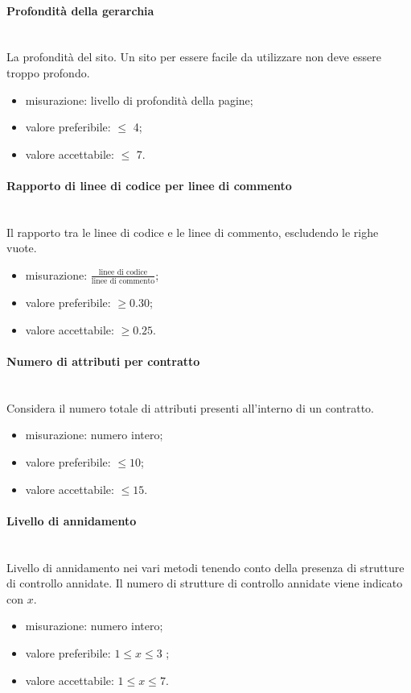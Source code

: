 			\paragraph*{Profondità della gerarchia} \mbox{}\\
			La profondità del sito. Un sito per essere facile da utilizzare non deve essere troppo profondo.
			\begin{itemize}
				\item misurazione: livello di profondità della pagine;
				\item valore preferibile: $\leq$ 4;
				\item valore accettabile: $\leq$ 7.
			\end{itemize}
		
			\paragraph*{Rapporto di linee di codice per linee di commento}
			 \mbox{}\\
			Il rapporto tra le linee di codice
			e le linee di commento, escludendo le righe vuote.
			\begin{itemize}
				\item misurazione: $\frac{\mbox{linee di codice}}{\mbox{linee di commento}}$;
				\item valore preferibile: $\geq 0.30$;
				\item valore accettabile: $\geq 0.25$.
			\end{itemize}
		
			\paragraph*{Numero di attributi per contratto}
			\mbox{}\\
			Considera il numero totale di attributi presenti
			all'interno di un contratto.
			\begin{itemize}
				\item misurazione: numero intero;
				\item valore preferibile: $\leq 10$;
				\item valore accettabile: $\leq 15$.
			\end{itemize}
		
			\paragraph*{Livello di annidamento}
			\mbox{}\\
			Livello di annidamento nei vari metodi tenendo conto della
			presenza di strutture di controllo annidate. Il numero di strutture di controllo annidate viene indicato con $x$.
			\begin{itemize}
				\item misurazione: numero intero;
				\item valore preferibile: $ 1 \leq x \leq3$ ;
				\item valore accettabile: $1 \leq x\leq 7$.
			\end{itemize}
	
